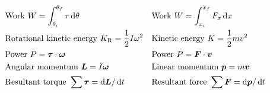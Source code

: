\[\begin{aligned}
         & \mathrm{Work}\ W=\int_{\theta_{i}}^{\theta_{f}}\tau \dif\theta                                                                                                       &   & \mathrm{Work}\ W=\int_{x_{i}}^{x_{f}}F_{x}\dif x          \\
         & \mathrm{Rotational~kinetic~energy~}K_{\mathrm{R}}=\frac{1}{2}I\omega^{2}                                                                                             &   & \mathrm{Kinetic~energy~}K=\frac{1}{2}mv^{2}               \\
         & \mathrm{Power}\ P=\vec{\tau}\cdot\vec{\omega}                                                                                                                        &   & \mathrm{Power}\ P=\vec{F}\cdot\vec{v}                     \\
         & \mathrm{Angular~momentum~}\vec{L}=I\vec{\omega}                                                                                                                      &   & \mathrm{Linear~momentum~}\vec{p}=m\vec{v}                 \\
         & \mathrm{Resultant~torque~}\sum\vec{\tau}=\dif \vec{L}/\dif t                                                                                                         &   & \mathrm{Resultant~force~}\sum \vec{F}=\dif \vec{p}/\dif t
    \end{aligned}\]











